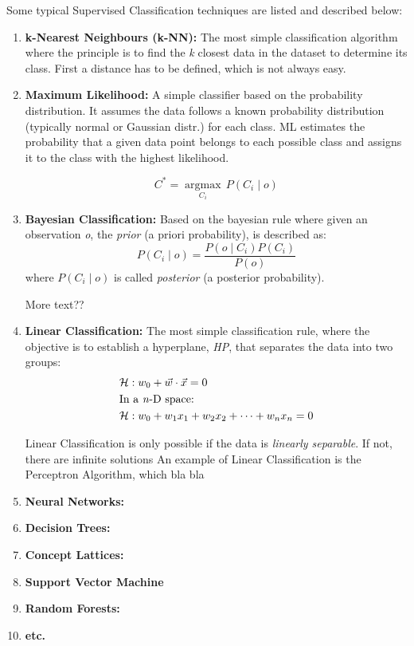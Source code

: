 Some typical Supervised Classification techniques are listed and described below:
\begin{enumerate}
    \item \textbf{k-Nearest Neighbours (k-NN):} The most simple classification algorithm where the principle is to find the \textit{k} closest data in the dataset to determine its class. 
    First a distance has to be defined, which is not always easy.

    
    \item \textbf{Maximum Likelihood:} A simple classifier based on the probability distribution.
    It assumes the data follows a known probability distribution (typically normal or Gaussian distr.) for each class.
    ML estimates the probability that a given data point belongs to each possible class and assigns it to the class with the highest likelihood.

    \begin{equation*}
        C^* = \underset{C_i}{\operatorname{argmax}} \, P(C_i \mid o)
    \end{equation*}

    
    \item \textbf{Bayesian Classification:}
    Based on the bayesian rule where given an observation \textit{o}, the \textit{prior} (a priori probability), is described as:
    \begin{equation*}
        P(C_i \mid o) = \frac{P(o \mid C_i) P(C_i)}{P(o)}
    \end{equation*}
    where $P(C_i \mid o)$ is called \textit{posterior} (a posterior probability).

    More text??

    
    \item \textbf{Linear Classification:}
    The most simple classification rule, where the objective is to establish a hyperplane, \textit{HP}, that separates the data into two groups:
    \begin{equation*}
    \begin{split}
        &\mathcal{H} : w_0 + \vec{w} \cdot \vec{x} = 0 \\
        &\text{In a \textit{n}-D space:} \\
        &\mathcal{H} : w_0 + w_1 x_1 + w_2 x_2 + \cdots + w_n x_n = 0
    \end{split}
    \end{equation*}

    Linear Classification is only possible if the data is \textit{linearly separable}. If not, there are infinite solutions
    An example of Linear Classification is the Perceptron Algorithm, which bla bla
    
    
    \item \textbf{Neural Networks:}
    \item \textbf{Decision Trees:}
    \item \textbf{Concept Lattices:}
    \item \textbf{Support Vector Machine}
    \item \textbf{Random Forests:}
    \item \textbf{etc.}
\end{enumerate}



